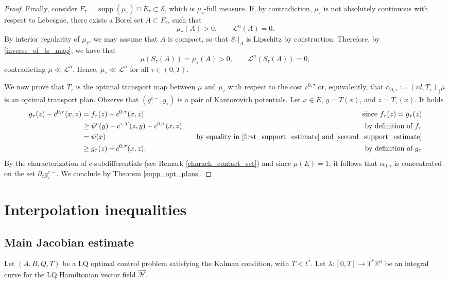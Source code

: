 \documentclass[reqno]{amsart}
\DeclareMathOperator{\supp}{supp}
\theoremstyle{plain}
\theoremstyle{definition}
\theoremstyle{remark}
\begin{document}
\begin{proof}
		Finally, consider $F_\tau=\supp(\mu_\tau)\cap E_\tau\subset\mathcal{E}$, which is $\mu_\tau$-full measure. If, by contradiction, $\mu_\tau$ is not absolutely continuous with respect to Lebesgue, there exists a Borel set $A\subset F_\tau$, such that
		\begin{equation}
			\mu_\tau(A)>0,\qquad\mathscr{L}^n(A)=0.
		\end{equation}
            By interior regularity of $\mu_\tau$, we may assume that $A$ is compact, so that $S_\tau|_A$ is Lipschitz by construction.
		Therefore, by \eqref{inverse_of_tr_map}, we have that
		\begin{equation}
			\mu(S_\tau(A))=\mu_\tau(A)>0,\qquad\mathscr{L}^n(S_\tau(A))=0,
		\end{equation}
	    contradicting $\mu\ll\mathscr{L}^n$. Hence, $\mu_\tau \ll \mathscr{L}^n$ for all $\tau\in (0,T)$.
        
        We now prove that $T_\tau$ is the optimal transport map between $\mu$ and $\mu_\tau$ with respect to the cost $c^{0,\tau}$ or, equivalently, that $\alpha_{0,\tau}:=(id,T_\tau)_{\sharp}\mu$ is an optimal transport plan. Observe that $(g_\tau^{c-},g_\tau)$ is a pair of Kantorovich potentials. 
        Let $x\in E$, $y=T(x)$, and $z=T_\tau(x)$. It holds
        \begin{align}
            g_\tau(z) - c^{0,\tau}(x,z) & = f_\tau(z)-c^{0,\tau}(x,z) & \quad \text{since $f_\tau(z)=g_\tau(z)$} \\
            & \geq \psi^c(y)-c^{\tau,T}(z,y)-c^{0,\tau}(x,z) & \quad \text{by definition of $f_\tau$} \\
            & = \psi(x) & \quad \text{by equality in \eqref{first_support_estimate} and \eqref{second_support_estimate}} \\
            & \geq g_\tau(z)-c^{0,\tau}(x,z). & \quad \text{by definition of $g_\tau$}
        \end{align}
        By the characterization of $c$-subdifferentials (see Remark \ref{charach_contact_set}) and since $\mu(E)=1$, it follows that $\alpha_{0,\tau}$ is concentrated on the set $\partial_c g_\tau^{c-}$. We conclude by Theorem \ref{supp_opt_plans}.
        \end{proof}

    \section{Interpolation inequalities}
        \subsection{Main Jacobian estimate}
        Let $(A,B,Q,T)$ be a LQ optimal control problem satisfying the Kalman condition, with $T<t^*$. Let $\lambda:[0,T]\to T^*\mathbb{R}^n$ be an integral curve for the LQ Hamiltonian vector field $\overrightarrow{\mathcal{H}}$.
        
\end{document}
